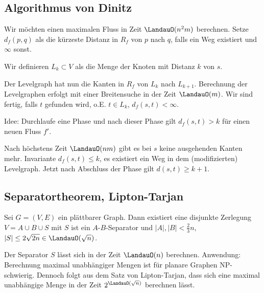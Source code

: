 

\subsection{Algorithmus von Dinitz}


Wir möchten einen maximalen Fluss in Zeit $\LandauO(n^2m)$ berechnen.
Setze $d_f(p,q)$ als die kürzeste Distanz in $R_f$ von $p$ nach $q$, falls ein Weg existiert und $\infty$ sonst.

Wir definieren $L_k \subset V$ als die Menge der Knoten mit Distanz $k$ von $s$.

Der Levelgraph hat nun die Kanten in $R_f$ von $L_k$ nach $L_{k+1}$.
Berechnung der Levelgraphen erfolgt mit einer Breitensuche in der Zeit $\LandauO(m)$.
Wir sind fertig, falls $t$ gefunden wird, o.E. $t \in L_k$, $d_f(s,t) < \infty$.

Idee: Durchlaufe eine Phase und nach dieser Phase gilt $d_f(s,t) > k$ für einen neuen Fluss $f'$.

\begin{algorithmic}
    \Else
    \EndIf
\end{algorithmic}
Nach höchstens Zeit $\LandauO(nm)$ gibt es bei $s$ keine ausgehenden Kanten mehr.
Invariante $d_f(s,t) \le k$, es existiert ein Weg in dem (modifizierten) Levelgraph.
Jetzt nach Abschluss der Phase gilt $d(s,t) \ge k + 1$.


\subsection{Separatortheorem, Lipton-Tarjan}

\begin{st}
    Sei $G = (V,E)$ ein plättbarer Graph.
    Dann existiert eine disjunkte Zerlegung $V = A \cup B \cup S$ mit $S$ ist ein $A$-$B$-Separator und $|A|, |B| < \frac{2}{3} n$, $|S| \le 2 \sqrt{2n} \in \LandauO(\sqrt n)$.
\end{st}

Der Separator $S$ lässt sich in der Zeit $\LandauO(n)$ berechnen.
Anwendung: Berechnung maximal unabhängiger Mengen ist für planare Graphen NP-schwierig.
Dennoch folgt aus dem Satz von Lipton-Tarjan, dass sich eine maximal unabhängige Menge in der Zeit $2^{\LandauO(\sqrt n)}$ berechnen lässt.

